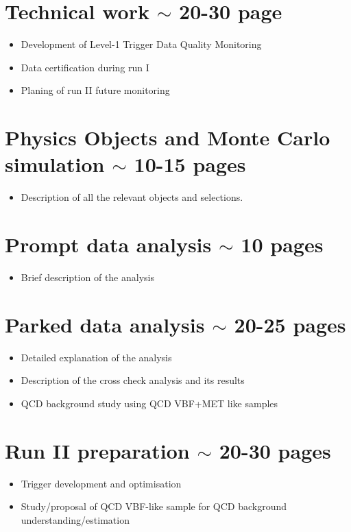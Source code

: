 \documentclass[a4paper,10pt]{article}
\begin{document}
\section{Technical work $\sim$ 20-30 page}

\begin{itemize}
  \item Development of Level-1 Trigger Data Quality Monitoring 
  \item Data certification during run I
  \item Planing of run II future monitoring 
\end{itemize}

\section{Physics Objects and Monte Carlo simulation $\sim$ 10-15 pages}

\begin{itemize}
  \item Description of all the relevant objects and selections.
\end{itemize}

\section{Prompt data analysis $\sim$ 10 pages}

\begin{itemize}
  \item Brief description of the analysis 
\end{itemize}

\section{Parked data analysis $\sim$ 20-25 pages}

\begin{itemize}
  \item Detailed explanation of the analysis
  \item Description of the cross check analysis and its results
  \item QCD background study using QCD VBF+MET like samples 
\end{itemize}

\section{Run II preparation $\sim$ 20-30 pages}

\begin{itemize}
  \item Trigger development and optimisation
  \item Study/proposal of QCD VBF-like sample for QCD background understanding/estimation
\end{itemize}
\end{document}
